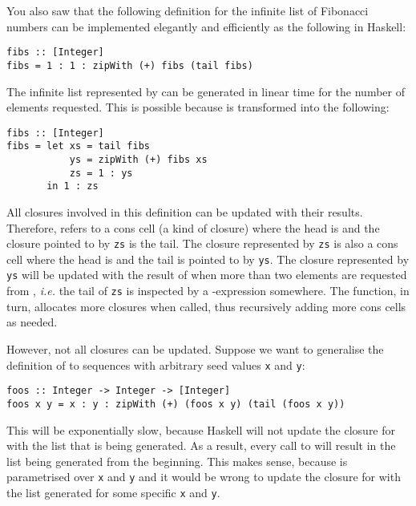 
\taskLine

You also saw that the following definition for the infinite list of Fibonacci numbers can be implemented elegantly and efficiently as the following in Haskell:
\begin{verbatim}
fibs :: [Integer]
fibs = 1 : 1 : zipWith (+) fibs (tail fibs)
\end{verbatim}
The infinite list represented by  can be generated in linear time for the number of elements requested. This is possible because  is transformed into the following:
\begin{verbatim}
fibs :: [Integer]
fibs = let xs = tail fibs 
           ys = zipWith (+) fibs xs
           zs = 1 : ys
       in 1 : zs
\end{verbatim}
All closures involved in this definition can be updated with their results. Therefore,  refers to a cons cell (a kind of closure) where the head is  and the closure pointed to by \texttt{\small zs} is the tail. The closure represented by \texttt{\small zs} is also a cons cell where the head is  and the tail is pointed to by \texttt{\small ys}. The closure represented by \texttt{\small ys} will be updated with the result of  when more than two elements are requested from , \emph{i.e.} the tail of \texttt{\small zs} is inspected by a -expression somewhere. The  function, in turn, allocates more closures when called, thus recursively adding more cons cells as needed.

However, not all closures can be updated. Suppose we want to generalise the definition of  to sequences with arbitrary seed values \texttt{\small x} and \texttt{\small y}:
\begin{verbatim}
foos :: Integer -> Integer -> [Integer]
foos x y = x : y : zipWith (+) (foos x y) (tail (foos x y))
\end{verbatim}
This will be exponentially slow, because Haskell will not update the closure for  with the list that is being generated. As a result, every call to  will result in the list being generated from the beginning. This makes sense, because  is parametrised over \texttt{\small x} and \texttt{\small y} and it would be wrong to update the closure for  with the list generated for some specific \texttt{\small x} and \texttt{\small y}. 

